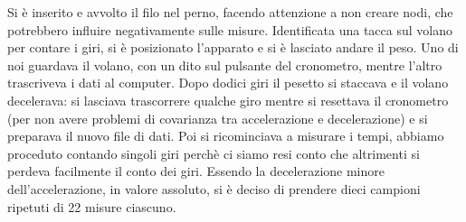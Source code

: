 Si è inserito e avvolto il filo nel perno, facendo attenzione a non creare nodi, che potrebbero influire negativamente sulle misure.
Identificata una tacca sul volano per contare i giri, si è posizionato l'apparato e si è lasciato andare il peso. 
Uno di noi guardava il volano, con un dito sul pulsante del cronometro, mentre l'altro trascriveva i dati al computer. Dopo dodici giri il pesetto si staccava e il volano decelerava:
si lasciava trascorrere qualche giro mentre si resettava il cronometro (per non avere problemi di covarianza tra accelerazione e decelerazione) 
e si preparava il nuovo file di dati. Poi si ricominciava a misurare i tempi, abbiamo proceduto contando singoli giri perchè ci siamo resi conto
che altrimenti si perdeva facilmente il conto dei giri.
Essendo la decelerazione minore dell'accelerazione, in valore assoluto, si è
deciso di prendere dieci campioni ripetuti di 22 misure ciascuno. 
